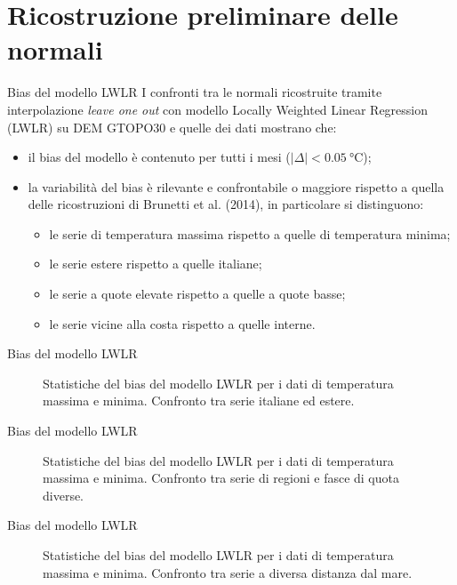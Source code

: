
\section{Ricostruzione preliminare delle normali}
\begin{frame}[t]{Bias del modello LWLR}
  I confronti tra le normali ricostruite tramite interpolazione \emph{leave one out} con modello Locally Weighted Linear Regression (LWLR) su DEM GTOPO30 e quelle dei dati mostrano che:
  \begin{itemize}
    \item il bias del modello è contenuto per tutti i mesi (\(\lvert \Delta \rvert < \qty{0.05}{\degreeCelsius}\));
    \item la variabilità del bias è rilevante e confrontabile o maggiore rispetto a quella delle ricostruzioni di Brunetti et al. (2014), in particolare si distinguono:
      \begin{itemize}
        \item le serie di temperatura massima rispetto a quelle di temperatura minima;
        \item le serie estere rispetto a quelle italiane;
        \item le serie a quote elevate rispetto a quelle a quote basse;
        \item le serie vicine alla costa rispetto a quelle interne.
      \end{itemize}
  \end{itemize}
\end{frame}

\begin{frame}[t]{Bias del modello LWLR}
  \begin{figure}
    
    \caption*{Statistiche del bias del modello LWLR per i dati di temperatura massima e minima. Confronto tra serie italiane ed estere.}
  \end{figure}
\end{frame}

\begin{frame}[t]{Bias del modello LWLR}
  \begin{figure}
    
    \caption*{Statistiche del bias del modello LWLR per i dati di temperatura massima e minima. Confronto tra serie di regioni e fasce di quota diverse.}
  \end{figure}
\end{frame}

\begin{frame}[t]{Bias del modello LWLR}
  \begin{figure}
    
    \caption*{Statistiche del bias del modello LWLR per i dati di temperatura massima e minima. Confronto tra serie a diversa distanza dal mare.}
  \end{figure}
\end{frame}